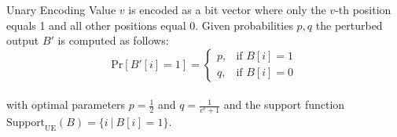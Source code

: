 \documentclass[aspectratio=43]{beamer}
\begin{document}



\begin{frame}{Unary Encoding}
    Value $v$ is encoded as a bit vector where only the $v$-th position equals 1 and all other positions equal 0. Given probabilities $p,q$ the perturbed output $B'$ is computed as follows:
    \bigskip
    $$
    \text{Pr}[B'[i] = 1] = 
        \begin{cases}
            p, & \text{if } B[i] = 1\\
            q, & \text{if } B[i] = 0
        \end{cases}
    $$\\
    \bigskip
    with optimal parameters $p = \frac{1}{2}$ and $q = \frac{1}{e^{\epsilon}+1}$ and the support function $\text{Support}_{\text{UE}}(B) = \{ i \ | \ B[i] = 1 \}$.
\end{frame}

\end{document}
